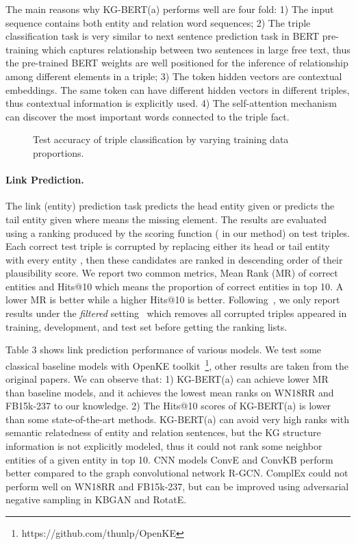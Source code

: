 \documentclass[letterpaper]{article} \usepackage{aaai20}  \usepackage{times}  \usepackage{helvet} \usepackage{courier}  \usepackage[hyphens]{url}  \usepackage{graphicx} \urlstyle{rm} \def\UrlFont{\rm}  \usepackage{graphicx}  \usepackage{amsmath}
\begin{document}
The main reasons why KG-BERT(a) performs well are four fold: 1) The input sequence contains both entity and relation word sequences; 2) The triple classification task is very similar to next sentence prediction task in BERT pre-training which captures relationship between two sentences in large free text, thus the pre-trained BERT weights are well positioned for the inference of relationship among different elements in a triple; 3) The token hidden vectors are contextual embeddings. The same token can have different hidden vectors in different triples, thus contextual information is explicitly used. 4) The self-attention mechanism can discover the most important words connected to the triple fact. 




\begin{figure}[t]
\centering
{}
\caption{Test accuracy of triple classification by varying training data proportions.}
\label{fig:proportion}
\end{figure}

\paragraph{Link Prediction.}
The link (entity) prediction task predicts the head entity  given  or predicts the tail entity  given  where  means the missing element. The results are evaluated using a ranking produced by the scoring function  ( in our method) on test triples. Each correct test triple  is corrupted by replacing either its head or tail entity with every entity , then these candidates are ranked in descending order of their plausibility score. We report two common metrics, Mean Rank (MR) of correct entities and Hits@10 which means the proportion of correct entities in top 10. A lower MR is better while a higher Hits@10 is better. Following~\cite{nguyen2018novel}, we only report results under the \textit{filtered} setting~\cite{bordes2013translating} which removes all corrupted triples appeared in training, development, and test set before getting the ranking lists. 

Table 3 shows link prediction performance of various models. We test some classical baseline models with OpenKE toolkit~\cite{han2018openke}\footnote{https://github.com/thunlp/OpenKE}, other results are taken from the original papers. We can observe that: 1) KG-BERT(a) can achieve lower MR than baseline models, and it achieves the lowest mean ranks on WN18RR and FB15k-237 to our knowledge. 2) The Hits@10 scores of KG-BERT(a) is lower than some state-of-the-art methods. KG-BERT(a) can avoid very high ranks with semantic relatedness of entity and relation sentences, but the KG structure information is not explicitly modeled, thus it could not rank some neighbor entities of a given entity in top 10. CNN models ConvE and ConvKB perform better compared to the graph convolutional network R-GCN. ComplEx could not perform well on WN18RR and FB15k-237, but can be improved using adversarial negative sampling in KBGAN and RotatE.
\end{document}
